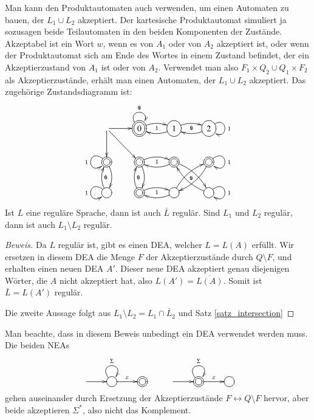 Man kann den Produktautomaten auch
verwenden, um einen Automaten zu bauen, der $L_1\cup L_2$
akzeptiert.
Der kartesische Produktautomat simuliert ja sozusagen
beide Teilautomaten in den beiden Komponenten der Zustände.
Akzeptabel ist ein Wort $w$, wenn es von $A_1$
oder von $A_2$ akzeptiert ist, oder wenn der Produktautomat
sich am Ende des Wortes in einem Zustand befindet, der ein
Akzeptierzustand von $A_1$ ist oder von $A_2$.
Verwendet
man also $F_1\times Q_2\cup Q_1\times F_2$ als Akzeptierzustände,
erhält man einen Automaten, der $L_1\cup L_2$ akzeptiert.
Das zugehörige Zustandsdiagramm ist:
\[
\entrymodifiers={++[o][F]}
\xymatrix{
*+\txt{} \ar[r] \ar[d] \ar[dr]
	&*++[o][F=]{0} \ar@/^/[r]_{\tt 1} \ar@(ul,ur)^{\tt 0}
		&{1} \ar@/^/[l] \ar@/^/[r]_{\tt 0}
			&{2}\ar@(ur,dr)^{\tt 1} \ar@/^/[l]
\\
*++[o][F=]{} \ar@/^/[d] \ar@(ul,dl)_{\tt 1}
	&*++[o][F=]{} \ar@/^/[d]{\tt 0} \ar@/^/[r]_{\tt 1}
		&*++[o][F=]{} \ar@/^/[l] \ar@/^/[dr]_{\tt 0}
			&*++[o][F=]{}\ar@(ur,dr)^{\tt 1} \ar@/^/[dl]
\\
{} \ar@/^/[u]_{\tt 0} \ar@(ul,dl)_{\tt 1}
	&*++[o][F=]{} \ar@/^/[u]_{\tt 0} \ar@/^/[r]_{\tt 1}
		&{} \ar@/^/[l] \ar@/^/[ur]
			&{}\ar@(ur,dr)^{\tt 1} \ar@/^/[ul]
}
\]

\begin{satz}
%
\label{satz_regcomplement}
Ist $L$ eine reguläre Sprache, dann ist auch $\bar L$ regulär.
Sind $L_1$ und $L_2$ regulär, dann ist auch $L_1\setminus L_2$
regulär.
\end{satz}

\begin{proof}[Beweis]
Da $L$ regulär ist, gibt es einen DEA, welcher $L=L(A)$ erfüllt.
Wir ersetzen in diesem DEA die Menge $F$ der Akzeptierzustände
durch $Q\setminus F$, und erhalten einen neuen DEA $A'$.
Dieser neue DEA akzeptiert genau diejenigen Wörter, die $A$ nicht
akzeptiert hat, also $L(A')=\overline{L(A)}$.
Somit ist $\bar L=L(A')$ regulär.

Die zweite Aussage folgt aus $L_1\setminus L_2=L_1\cap\bar L_2$ und
Satz \ref{satz_intersection}
\end{proof}
Man beachte, dass in diesem Beweis unbedingt ein DEA verwendet werden
muss.
Die beiden NEAs
\[
\entrymodifiers={++[o][F]}
\xymatrix{
*+\txt{}\ar[r]
	&{}\ar@(ul,ur)^{\Sigma} \ar[r]^{\varepsilon}
		&*++[o][F=]{}
&
*+\txt{}\ar[r]
	&*++[o][F=]{}\ar@(ul,ur)^{\Sigma} \ar[r]^{\varepsilon}
		&{}
}
\]
gehen auseinander durch Ersetzung der Akzeptierzustände
$F\leftrightarrow Q\setminus F$ hervor, aber beide akzeptieren
$\Sigma^*$, also nicht das Komplement.

